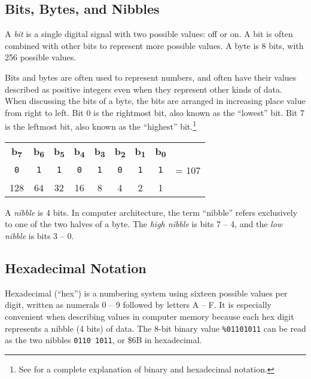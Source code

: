 \subsection{Bits, Bytes, and Nibbles}

A {\em bit} is a single digital signal with two possible values: off or on. A
bit is often combined with other bits to represent more possible values. A byte
is 8 bits, with 256 possible values.

Bits and bytes are often used to represent numbers, and often have their values
described as positive integers even when they represent other kinds of data.
When discussing the bits of a byte, the bits are arranged in increasing place
value from right to left. Bit 0 is the rightmost bit, also known as the
``lowest'' bit.  Bit 7 is the leftmost bit, also known as the ``highest'' bit.\footnote{See
 for a complete explanation of
binary and hexadecimal notation.}

\begin{center}
\begin{tabular}{ccccccccl}
{\bf b\textsubscript{7}} &
{\bf b\textsubscript{6}} &
{\bf b\textsubscript{5}} &
{\bf b\textsubscript{4}} &
{\bf b\textsubscript{3}} &
{\bf b\textsubscript{2}} &
{\bf b\textsubscript{1}} &
{\bf b\textsubscript{0}} & \\
\huge\texttt{0} &
\huge\texttt{1} &
\huge\texttt{1} &
\huge\texttt{0} &
\huge\texttt{1} &
\huge\texttt{0} &
\huge\texttt{1} &
\huge\texttt{1} & = 107 \\
\small{}128 &
\small{}64 &
\small{}32 &
\small{}16 &
\small{}8 &
\small{}4 &
\small{}2 &
\small{}1 & \\
\end{tabular}
\end{center}

A {\em nibble} is 4 bits. In computer architecture, the term ``nibble'' refers
exclusively to one of the two halves of a byte. The {\em high nibble} is bits 7 --
4, and the {\em low nibble} is bits 3 -- 0.

\subsection{Hexadecimal Notation}

Hexadecimal (``hex'') is a numbering system using sixteen possible values per digit,
written as numerals 0 -- 9 followed by letters A -- F. It is especially
convenient when describing values in computer memory because each hex digit
represents a nibble (4 bits) of data. The 8-bit binary value \texttt{\%01101011} can be
read as the two nibbles \texttt{0110 1011}, or \$6B in hexadecimal.

